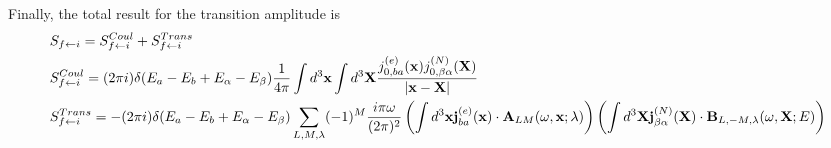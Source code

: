 Finally, the total result for the transition amplitude is
\begin{align}
     & S_{f\leftarrow i} = S_{f\leftarrow i}^{Coul} + S_{f\leftarrow i  } ^{Trans}                                                                                                                                                                                                                                                                                          \\
     & S_{f\leftarrow i}^{Coul} = (2\pi i)\delta(E_a-E_{b}+E_\alpha-E_{\beta}) \frac{1}{4\pi}\int{d^3{\bf x}}\int d^3{\bf X} \frac{j^{(e)}_{0,ba}({\bf x})  j^{(N)}_{0,\beta\alpha} ({\bf X})}{|{\bf x} - {\bf X}|}  \nonumber                                                                                                                                              \\
     & S_{f\leftarrow i}^{Trans    }=-(2\pi i)\delta(E_a-E_{b}+E_\alpha-E_{\beta}) \sum\limits_{L,M,\lambda}(-1)^M \frac{i\pi \omega}{(2\pi)^2} \left( \int d^3{\bf x} {\bf j}^{(e)}_{ba}({\bf x})\cdot{\bf A}_{LM}(\omega,{\bf x};\lambda)\right) \left(\int d^3{\bf X}{\bf j}^{(N)}_{\beta\alpha}({\bf X}) \cdot {\bf B}_{L,-M,\lambda}(\omega,{\bf X};E)\right)\nonumber
\end{align}
